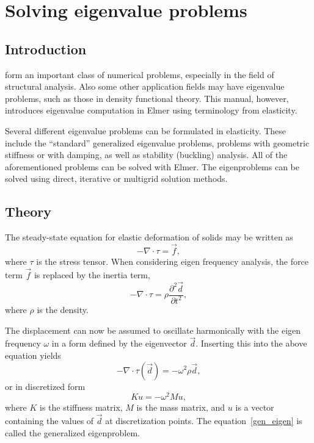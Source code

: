 \chapter{Solving eigenvalue problems}
\noindent

\section{Introduction}

 form an important class of numerical problems,
especially in the field of structural analysis. Also some other
application fields may have eigenvalue problems, such as those in
density functional theory. This manual, however, introduces eigenvalue
computation in Elmer using terminology from elasticity.

Several different eigenvalue problems can be formulated in
elasticity. These include the ``standard'' generalized eigenvalue
problems, problems with geometric stiffness or with damping, as well
as stability (buckling) analysis. All of the aforementioned problems
can be solved with Elmer. The eigenproblems can be solved using
direct, iterative or multigrid solution methods.


\section{Theory}

The steady-state equation for elastic deformation of solids may be
written as
\begin{equation}
-\nabla\cdot\tau = \vec{f},
\end{equation}
where $\tau$ is the stress tensor. When considering eigen frequency
analysis, the force term $\vec{f}$ is replaced by the inertia term,
\begin{equation}
-\nabla\cdot\tau = \rho\frac{\partial^2 \vec{d}}{\partial t^2},
\end{equation}
where $\rho$ is the density.

The displacement can now be assumed to oscillate harmonically with the
eigen frequency $\omega$ in a form defined by the eigenvector
$\vec{d}$. Inserting this into the above equation yields
\begin{equation}
-\nabla\cdot\tau(\vec{d}) = 
-\omega^2\rho\vec{d},
\end{equation}
or in discretized form
\begin{equation}
\label{gen_eigen}
Ku = -\omega^2Mu,
\end{equation}
where $K$ is the stiffness matrix, $M$ is the mass matrix, and $u$ is
a vector containing the values of $\vec{d}$ at discretization
points. The equation~\ref{gen_eigen} is called the generalized
eigenproblem.

